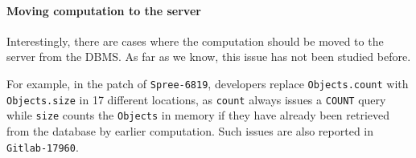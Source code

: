 

\vspace{-0.08in} 
\paragraph{\bf{Moving computation to the server}} %
Interestingly, there are cases where the computation should be moved to the server from the DBMS. %
As far as we know, this issue has not been studied before. 

%
For example, in the patch of \texttt{Spree-6819}, developers replace 
\texttt{Objects.count} with \texttt{Objects.size} in 17 different locations, as
\texttt{count} always issues a \texttt{COUNT} query while \texttt{size} counts the 
\texttt{Objects} in memory
if they have already been retrieved from the database by earlier computation.
Such issues are also reported in {\tt Gitlab-17960}.

